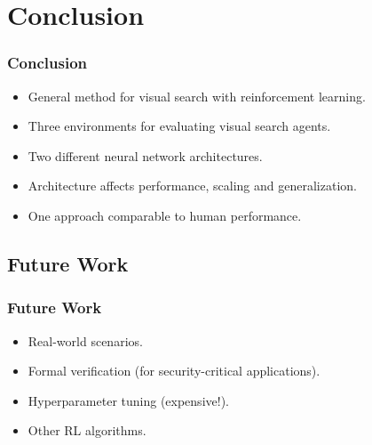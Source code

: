\section{Conclusion}

\begin{frame}
    \frametitle{Conclusion}

    \begin{itemize}
        \item General method for visual search with reinforcement learning.
        \item Three environments for evaluating visual search agents.
        \item Two different neural network architectures.
        \item Architecture affects performance, scaling and generalization.
        \item One approach comparable to human performance.
    \end{itemize}
\end{frame}

\subsection{Future Work}

\begin{frame}
    \frametitle{Future Work}

    \begin{itemize}
        \item Real-world scenarios.
        \item Formal verification (for security-critical applications).
        \item Hyperparameter tuning (expensive!).
        \item Other RL algorithms.
    \end{itemize}
\end{frame}